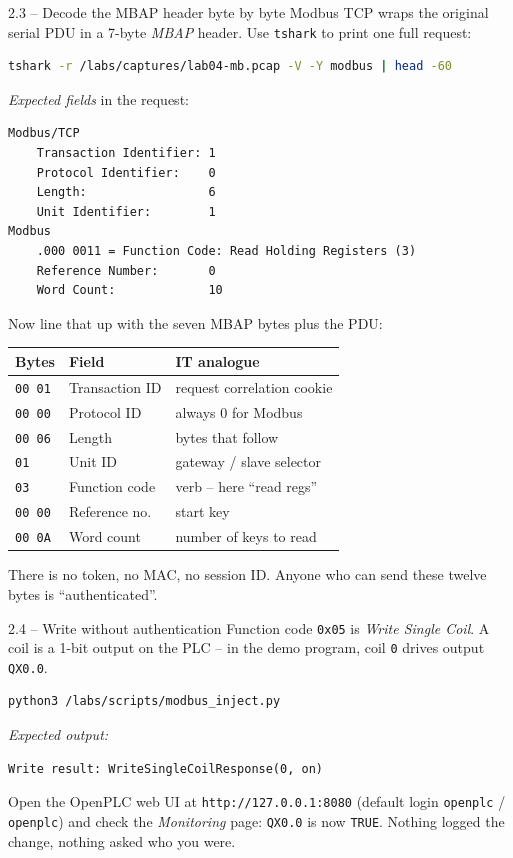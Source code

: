 \documentclass[11pt,a4paper]{article}
\begin{document}
\begin{stepbox}{2.3 -- Decode the MBAP header byte by byte}
Modbus TCP wraps the original serial PDU in a 7-byte \emph{MBAP} header.
Use \texttt{tshark} to print one full request:
\begin{lstlisting}[language=bash]
tshark -r /labs/captures/lab04-mb.pcap -V -Y modbus | head -60
\end{lstlisting}
\emph{Expected fields} in the request:
\begin{lstlisting}
Modbus/TCP
    Transaction Identifier: 1
    Protocol Identifier:    0
    Length:                 6
    Unit Identifier:        1
Modbus
    .000 0011 = Function Code: Read Holding Registers (3)
    Reference Number:       0
    Word Count:             10
\end{lstlisting}
Now line that up with the seven MBAP bytes plus the PDU:
\begin{center}\small
\begin{tabular}{@{}lll@{}}
\toprule
\textbf{Bytes} & \textbf{Field} & \textbf{IT analogue} \\
\midrule
\texttt{00 01} & Transaction ID  & request correlation cookie \\
\texttt{00 00} & Protocol ID     & always 0 for Modbus \\
\texttt{00 06} & Length          & bytes that follow \\
\texttt{01}    & Unit ID         & gateway / slave selector \\
\texttt{03}    & Function code   & verb -- here ``read regs'' \\
\texttt{00 00} & Reference no.   & start key \\
\texttt{00 0A} & Word count      & number of keys to read \\
\bottomrule
\end{tabular}
\end{center}
There is no token, no MAC, no session ID. Anyone who can send these
twelve bytes is ``authenticated''.
\end{stepbox}

\begin{stepbox}{2.4 -- Write without authentication}
Function code \texttt{0x05} is \emph{Write Single Coil}. A coil is a
1-bit output on the PLC -- in the demo program, coil \texttt{0} drives
output \texttt{QX0.0}.
\begin{lstlisting}[language=bash]
python3 /labs/scripts/modbus_inject.py
\end{lstlisting}
\emph{Expected output:}
\begin{lstlisting}
Write result: WriteSingleCoilResponse(0, on)
\end{lstlisting}
Open the OpenPLC web UI at \texttt{http://127.0.0.1:8080} (default login
\texttt{openplc} / \texttt{openplc}) and check the \emph{Monitoring}
page: \texttt{QX0.0} is now \texttt{TRUE}. Nothing logged the change,
nothing asked who you were.
\end{stepbox}
\end{document}
